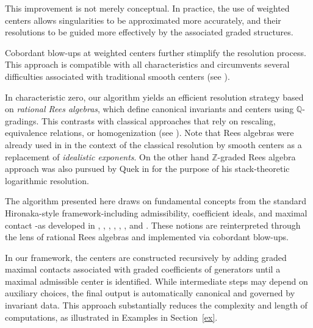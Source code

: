 \documentclass{amsart}
\newcommand{\ZZ}{{\mathbb{Z}}}
\begin{document}
This improvement is not merely conceptual. In practice, the use of weighted centers allows singularities to be approximated more accurately, and their resolutions to be guided more effectively by the associated graded structures. 


Cobordant blow-ups at weighted centers further stimplify the resolution process. This approach is compatible with all characteristics and circumvents several difficulties associated with traditional smooth centers (see \cite{Abh67, Moh87, Moh96, Hau96, W08, CP08, CP09, Cut11, BV13, KM16, HP18}). 

In characteristic zero, our algorithm yields an efficient resolution strategy based on \emph{rational Rees algebras}, which define canonical invariants and centers using \(\mathbb{Q}\)-gradings. This contrasts with classical approaches that rely on rescaling, equivalence relations, or homogenization (see \cite{Villamayor, Bierstone-Milman, Wlodarczyk, Encinas-Hauser, Kollar, Bierstone-Milman-funct}). Note that  Rees algebras were already used  in \cite{Encinas-Villamayor,BV}  in the context of the classical resolution by smooth centers as a replacement of {\it idealistic exponents}. On the other hand $\ZZ$-graded Rees algebra approach was also pursued by Quek in \cite{Quek} for the purpose of his stack-theoretic logarithmic resolution.

The algorithm presented here draws on fundamental concepts from the standard Hironaka-style framework-including admissibility, coefficient ideals, and maximal contact -as developed in \cite{Hironaka}, \cite{Villamayor}, \cite{Bierstone-Milman}, \cite{Wlodarczyk}, \cite{Encinas-Hauser}, \cite{Encinas-Villamayor}, and \cite{Kollar}. These notions are reinterpreted through the lens of rational  Rees algebras and implemented via cobordant blow-ups.

 In our framework, the centers are constructed recursively by adding graded maximal contacts  associated with  graded coefficients  of generators until a maximal admissible center is identified. While intermediate steps may depend on auxiliary choices, the final output is automatically canonical and governed by invariant data. This approach substantially reduces the complexity and length of computations, as illustrated in Examples in Section~\ref{ex}.  %
\end{document}
